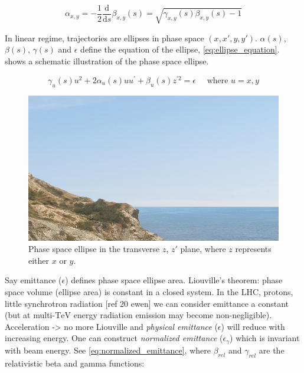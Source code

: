 \begin{equation}
    \alpha_{x, y} = -\frac{1}{2} \frac{\mathrm{d}}{\mathrm{d}s} \beta_{x, y}(s) = \sqrt{\gamma_{x, y}(s) \beta_{x, y}(s) - 1}
    \label{eq:alpha_function}
\end{equation}
\bigbreak

In linear regime, trajectories are ellipses in phase space $(x, x\prime, y, y\prime)$.
$\alpha(s)$, $\beta(s)$, $\gamma(s)$ and $\epsilon$ define the equation of the ellipse, \cref{eq:ellipse_equation}.
 shows a schematic illustration of the phase space ellipse.
\bigbreak

\begin{equation}
    \gamma_{u}(s) u^{2} + 2 \alpha_{u}(s) u u^{\prime} + \beta_{u}(s) z^{\prime 2} = \epsilon \quad \text { where } u = x, y
    \label{eq:ellipse_equation}
\end{equation}
\bigbreak

\begin{figure}[!htb]
    \begin{center}
    \includegraphics[width = 0.85\linewidth]{Figures/placeholder.png}
    \caption{Phase space ellipse in the transverse $z$, $z\prime$ plane, where $z$ represents either $x$ or $y$.}
    \label{figure:phase_space_ellipse}
    \end{center}
\end{figure}

Say emittance ($\epsilon$) defines phase space ellipse area.
Liouville's theorem: phase space volume (ellipse area) is constant in a closed system.
In the LHC, protons, little synchrotron radiation [ref 20 ewen] we can consider emittance a constant (but at multi-$\mathrm{TeV}$ energy radiation emission may become non-negligible).
Acceleration -> no more Liouville and \emph{physical emittance} ($\epsilon$) will reduce with increasing energy.
One can construct \emph{normalized emittance} ($\epsilon_{\gamma}$) which is invariant with beam energy.
See \cref{eq:normalized_emittance}, where $\beta_{rel}$ and $\gamma_{rel}$ are the relativistic beta and gamma functions:
\bigbreak

